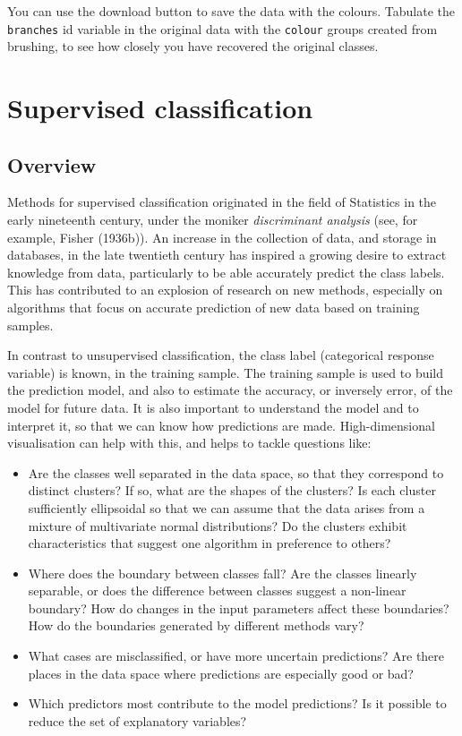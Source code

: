 \documentclass[
  letterpaper,
]{krantz}
\providecommand{\tightlist}{%
  \setlength{\itemsep}{0pt}\setlength{\parskip}{0pt}}\usepackage{longtable,booktabs,array}
\begin{document}
You can use the download button to save the data with the colours.
Tabulate the \texttt{branches} id variable in the original data with the
\texttt{colour} groups created from brushing, to see how closely you
have recovered the original classes.

\part{Supervised classification}

\hypertarget{overview-1}{%
\chapter{Overview}\label{overview-1}}

Methods for supervised classification originated in the field of
Statistics in the early nineteenth century, under the moniker
\emph{discriminant analysis} (see, for example, Fisher (1936b)). An
increase in the collection of data, and storage in databases, in the
late twentieth century has inspired a growing desire to extract
knowledge from data, particularly to be able accurately predict the
class labels. This has contributed to an explosion of research on new
methods, especially on algorithms that focus on accurate prediction of
new data based on training samples.


In contrast to unsupervised classification, the class label (categorical
response variable) is known, in the training sample. The training sample
is used to build the prediction model, and also to estimate the
accuracy, or inversely error, of the model for future data. It is also
important to understand the model and to interpret it, so that we can
know how predictions are made. High-dimensional visualisation can help
with this, and helps to tackle questions like:

\begin{itemize}
\tightlist
\item
  Are the classes well separated in the data space, so that they
  correspond to distinct clusters? If so, what are the shapes of the
  clusters? Is each cluster sufficiently ellipsoidal so that we can
  assume that the data arises from a mixture of multivariate normal
  distributions? Do the clusters exhibit characteristics that suggest
  one algorithm in preference to others?
\item
  Where does the boundary between classes fall? Are the classes linearly
  separable, or does the difference between classes suggest a non-linear
  boundary? How do changes in the input parameters affect these
  boundaries? How do the boundaries generated by different methods vary?
\item
  What cases are misclassified, or have more uncertain predictions? Are
  there places in the data space where predictions are especially good
  or bad?
\item
  Which predictors most contribute to the model predictions? Is it
  possible to reduce the set of explanatory variables?
\end{itemize}
\end{document}
